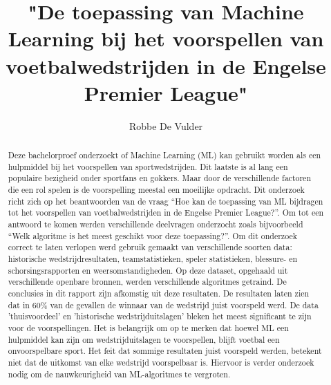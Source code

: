 \documentclass{hogent-article}
\title{"De toepassing van Machine Learning bij het voorspellen van voetbalwedstrijden in de Engelse Premier League"}
\author{Robbe De Vulder}
\begin{document}
\begin{abstract}

Deze bachelorproef onderzoekt of Machine Learning (ML) kan gebruikt worden als een hulpmiddel bij het voorspellen van sportwedstrijden. Dit laatste is al lang een populaire bezigheid onder sportfans en gokkers. Maar door de verschillende factoren die een rol spelen is de voorspelling meestal een moeilijke opdracht.
Dit onderzoek richt zich op het beantwoorden van de vraag “Hoe kan de toepassing van ML  bijdragen tot het voorspellen van voetbalwedstrijden in de Engelse Premier League?”. Om tot een antwoord te komen werden verschillende deelvragen onderzocht zoals bijvoorbeeld “Welk algoritme is het meest geschikt voor deze toepassing?”.
Om dit onderzoek correct te laten verlopen werd gebruik gemaakt van verschillende soorten data: historische wedstrijdresultaten, teamstatistieken, speler statistieken, blessure- en schorsingsrapporten en weersomstandigheden. Op deze dataset, opgehaald uit verschillende openbare bronnen, werden verschillende algoritmes getraind. De conclusies in dit rapport zijn afkomstig uit deze resultaten.
De resultaten laten zien dat in 60\% van de gevallen de winnaar van de wedstrijd juist voorspeld werd. De data 'thuisvoordeel' en 'historische wedstrijduitslagen' bleken het meest significant te zijn voor de voorspellingen.
Het is belangrijk om op te merken dat hoewel ML een hulpmiddel kan zijn om wedstrijduitslagen te voorspellen, blijft voetbal een onvoorspelbare sport. Het feit dat sommige resultaten juist voorspeld werden, betekent niet dat de uitkomst van elke wedstrijd voorspelbaar is. Hiervoor is verder onderzoek nodig om de nauwkeurigheid van ML-algoritmes te vergroten.  

\end{abstract}

\tableofcontents



\printbibliography[heading=bibintoc]
\end{document}
